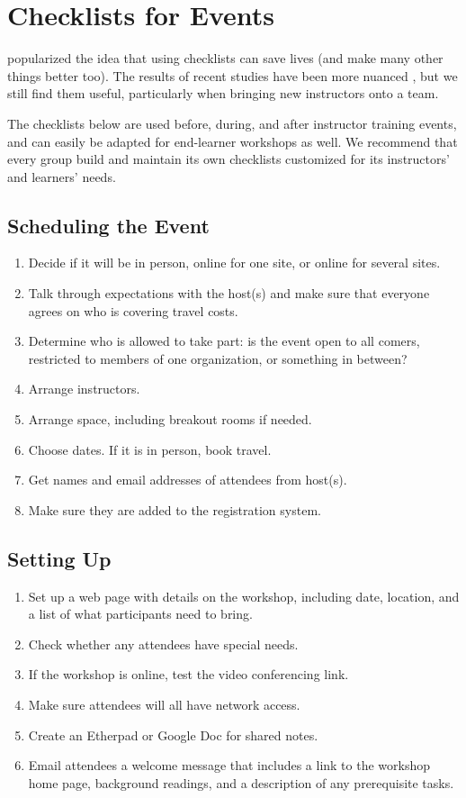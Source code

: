 \chapter{Checklists for Events}\label{s:events}

\cite{Gawa2007} popularized the idea that using checklists can save
lives (and make many other things better too). The results of recent
studies have been more nuanced \cite{Avel2013,Urba2014}, but we
still find them useful, particularly when bringing new instructors
onto a team.

The checklists below are used before, during, and after instructor
training events, and can easily be adapted for end-learner workshops as
well. We recommend that every group build and maintain its own
checklists customized for its instructors' and learners' needs.

\section*{Scheduling the Event}

\begin{enumerate}
\item
  Decide if it will be in person, online for one site, or online for
  several sites.
\item
  Talk through expectations with the host(s) and make sure that everyone
  agrees on who is covering travel costs.
\item
  Determine who is allowed to take part: is the event open to all
  comers, restricted to members of one organization, or something in
  between?
\item
  Arrange instructors.
\item
  Arrange space, including breakout rooms if needed.
\item
  Choose dates. If it is in person, book travel.
\item
  Get names and email addresses of attendees from host(s).
\item
  Make sure they are added to the registration system.
\end{enumerate}

\section*{Setting Up}

\begin{enumerate}
\item
  Set up a web page with details on the workshop, including date,
  location, and a list of what participants need to bring.
\item
  Check whether any attendees have special needs.
\item
  If the workshop is online, test the video conferencing link.
\item
  Make sure attendees will all have network access.
\item
  Create an Etherpad or Google Doc for shared notes.
\item
  Email attendees a welcome message that includes a link to the workshop
  home page, background readings, and a description of any prerequisite
  tasks.
\end{enumerate}

